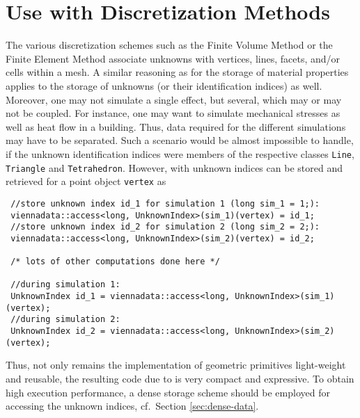 \section{Use with Discretization Methods}
The various discretization schemes such as the Finite Volume Method or the Finite Element Method associate unknowns with vertices, lines, facets, and/or cells within a mesh.
A similar reasoning as for the storage of material properties applies to the storage of unknowns (or their identification indices) as well. Moreover, one may not simulate a single effect, but several, which may or may not be coupled. For instance, one may want to simulate mechanical stresses as well as heat flow in a building. Thus, data required for the different simulations may have to be separated. Such a scenario would be almost impossible to handle, if the unknown identification indices were members of the respective classes \lstinline|Line|, \lstinline|Triangle| and \lstinline|Tetrahedron|. However, with {\ViennaData} unknown indices can be stored and retrieved for a point object \lstinline|vertex| as
\begin{lstlisting}
 //store unknown index id_1 for simulation 1 (long sim_1 = 1;):
 viennadata::access<long, UnknownIndex>(sim_1)(vertex) = id_1; 
 //store unknown index id_2 for simulation 2 (long sim_2 = 2;):
 viennadata::access<long, UnknownIndex>(sim_2)(vertex) = id_2; 

 /* lots of other computations done here */

 //during simulation 1:
 UnknownIndex id_1 = viennadata::access<long, UnknownIndex>(sim_1)(vertex); 
 //during simulation 2:
 UnknownIndex id_2 = viennadata::access<long, UnknownIndex>(sim_2)(vertex); 
\end{lstlisting}
Thus, not only remains the implementation of geometric primitives light-weight and reusable, the resulting code due to {\ViennaData} is very compact and expressive. 
To obtain high execution performance, a dense storage scheme should be employed for accessing the unknown indices, cf.~Section \ref{sec:dense-data}.


